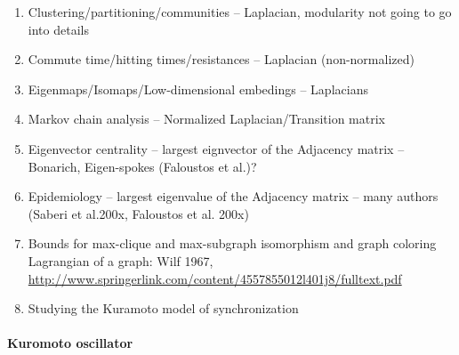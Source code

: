 \documentclass[nofonts]{dgleich-article}
\begin{document}
\begin{enumerate}
\item Clustering/partitioning/communities -- Laplacian, modularity not going to go into details \cite{Fiedler1973-algebraic-connectivity,Shi2000-normalized-cuts,%
Newman2004-community}
\item Commute time/hitting times/resistances -- Laplacian (non-normalized)
\cite{Gobel1974-random-walks}
\item Eigenmaps/Isomaps/Low-dimensional embedings -- Laplacians
\item  Markov chain analysis -- Normalized Laplacian/Transition matrix
\cite{levin2008-markov}
\item  Eigenvector centrality -- largest eignvector of the Adjacency matrix -- Bonarich, Eigen-spokes (Faloustos et al.)?
\item  Epidemiology -- largest eigenvalue of the Adjacency matrix -- many authors
(Saberi et al.200x, Faloustos et al. 200x)
\item  Bounds for max-clique and max-subgraph isomorphism and graph coloring 
\cite{motzkin1965-turan}  Lagrangian of a graph: Wilf 1967,
\url{http://www.springerlink.com/content/4557855012l401j8/fulltext.pdf}
\item  Studying the Kuramoto model of synchronization \cite{arenas2008-synchronization}
\end{enumerate}

\paragraph{Kuromoto oscillator}







 
\end{document}
